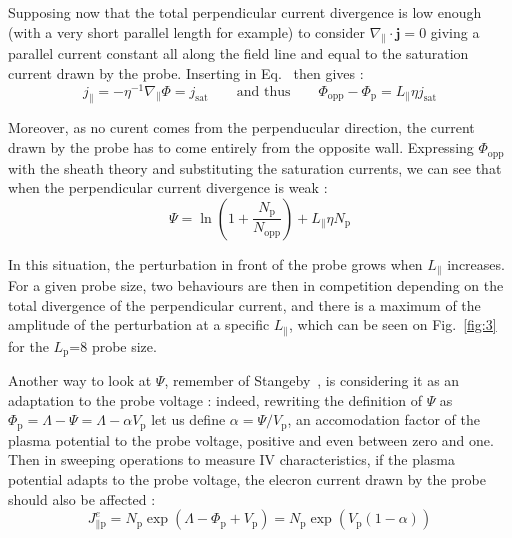 \documentclass[cpp,a4paper,fleqn,twoside%
]{w-art}
\makeatletter
\renewcommand*{\eqref}[1]{%
  \hyperref[{#1}]{\textup{\tagform@{\ref*{#1}}}}%
}
\makeatother
\begin{document}
Supposing now that the total perpendicular current divergence is low enough 
(with a very short parallel length for example) to consider 
$\nabla_\parallel\cdot \mathbf j =0$ giving a parallel current constant 
all along the field line and equal to the saturation current drawn by 
the probe. Inserting in Eq.~\eqref{eq_Ohms_law} then gives :
\begin{equation}
\label{eqConstantCurrent2}
  j_\parallel=-\eta^{-1}\nabla_\parallel\Phi=j_\text{sat}\qquad\text{and thus}
  \qquad \Phi_\text{opp}-\Phi_\text{p}=L_\parallel\eta j_\text{sat}
\end{equation}

Moreover, as no curent comes from the perpenducular direction, the 
current drawn by the probe has to come entirely from the opposite wall. 
Expressing $\Phi_\text{opp}$ with the sheath theory and 
substituting the saturation currents, we can see that when the 
perpendicular current divergence is weak :
\begin{equation}
\label{eqConstantCurrent3}
  \Psi=\ln\left(
  1+\frac{N_\text{p}}{N_\text{opp}}\right)+L_\parallel\eta N_\text{p}
\end{equation}

In this situation, the perturbation in front of the probe grows when 
$L_\parallel$ increases. For a given probe size, two behaviours are 
then in competition depending on the total divergence 
of the perpendicular current, and there is a maximum of the amplitude 
of the perturbation at a specific $L_\parallel$, which can be seen on 
Fig.~\ref{fig:3} for the $L_\text{p}$=8 probe size.

Another way to look at $\Psi$, remember of 
Stangeby~\cite{Stangeby95-2}, is considering it as an adaptation to the 
probe voltage : indeed, rewriting the definition of $\Psi$ as 
$\Phi_\text{p}=\Lambda-\Psi=\Lambda-\alpha V_\text{p}$ let us define 
$\alpha=\Psi/V_\text{p}$, an accomodation factor of the plasma potential to the probe 
voltage, positive and even between zero and one. Then in sweeping 
operations to measure IV characteristics, if the plasma potential adapts to the probe voltage,
the elecron current drawn by the probe should also be affected :
\begin{equation}
J_{\parallel 
\text{p}}^e=N_\text{p}\exp\left(\Lambda-\Phi_\text{p}+V_\text{p}\right)=
N_\text{p}\exp\left(V_\text{p}(1-\alpha)\right)
\end{equation}
\end{document}
